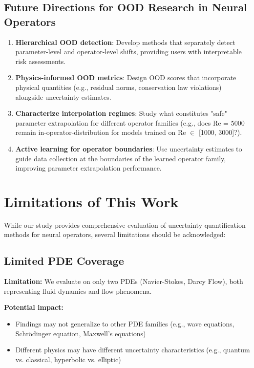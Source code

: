 \subsection{Future Directions for OOD Research in Neural Operators}

\begin{enumerate}
\item \textbf{Hierarchical OOD detection}: Develop methods that separately detect parameter-level and operator-level shifts, providing users with interpretable risk assessments.

\item \textbf{Physics-informed OOD metrics}: Design OOD scores that incorporate physical quantities (e.g., residual norms, conservation law violations) alongside uncertainty estimates.

\item \textbf{Characterize interpolation regimes}: Study what constitutes "safe" parameter extrapolation for different operator families (e.g., does Re = 5000 remain in-operator-distribution for models trained on Re $\in$ [1000, 3000]?).

\item \textbf{Active learning for operator boundaries}: Use uncertainty estimates to guide data collection at the boundaries of the learned operator family, improving parameter extrapolation performance.
\end{enumerate}

\section{Limitations of This Work}

While our study provides comprehensive evaluation of uncertainty quantification methods for neural operators, several limitations should be acknowledged:

\subsection{Limited PDE Coverage}

\textbf{Limitation:} We evaluate on only two PDEs (Navier-Stokes, Darcy Flow), both representing fluid dynamics and flow phenomena.

\textbf{Potential impact:}
\begin{itemize}
\item Findings may not generalize to other PDE families (e.g., wave equations, Schrödinger equation, Maxwell's equations)
\item Different physics may have different uncertainty characteristics (e.g., quantum vs. classical, hyperbolic vs. elliptic)
\end{itemize}

